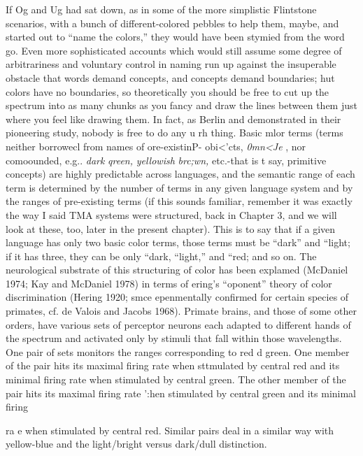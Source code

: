 If Og and Ug had sat down, as in some of the more simplistic Flintstone scenarios, with a bunch of different-colored pebbles to help them, maybe, and started out to ``name the colors,'' they would have been stymied from the word go. Even more sophisticated accounts which would still assume some degree of arbitrariness and voluntary control in naming run up against the insuperable obstacle that words demand concepts, and concepts demand boundaries; hut colors have no boundaries, so theoretically you should be free to cut up the spec\-trum into as many chunks as you fancy and draw the lines between them just where you feel like drawing them. In fact, as Berlin and \citet{Kay1969} demonstrated in their pioneering study, nobody is free to do any u rh thing. Basic mlor terms (terms neither borrowecl from names of ore-existinP- obi{\textless}'cts, \textit{0mn}\textit{{\textless}Je} , nor comoounded, e.g.. \textit{d}\textit{ark} \textit{qreen,} \textit{yellowish} \textit{br}\textit{c}\textit{;}\textit{wn,} etc.-that is t say, primitive concepts) are highly predictable across languages, and the semantic range of each term is determined by the number of terms in any given language system and by the ranges of pre-existing terms (if this sounds familiar, remember it was exactly the way I said TMA systems were structured, back in Chapter 3, and we will look at these, too, later in the present chapter). This is to say that if a given language has only two basic color terms, those terms must be ``dark'' and ``light{\textquotedbl}; if it has three, they can be only ``dark,{\textquotedbl} ``light,'' and ``red{\textquotedbl}; and so on.
The neurological substrate of this structuring of color has been explamed (McDaniel 1974; Kay and McDaniel 1978) in terms of ering's ``oponent'' theory of color discrimination (Hering 1920; smce epenmentally confirmed for certain species of primates, cf. de Valois and Jacobs 1968). Primate brains, and those of some other orders, have various sets of perceptor neurons each adapted to different hands of the spectrum and activated only by stimuli that fall within
those wavelengths. One pair of sets monitors the ranges corresponding to red d green. One member of the pair hits its maximal firing rate when sttmulated by central red and its minimal firing rate when stimu\-lated by central green. The other member of the pair hits its maximal firing rate ':hen stimulated by central green and its minimal firing

ra e when stimulated by central red. Similar pairs deal in a similar way with yellow-blue and the light/bright versus dark/dull distinction.

